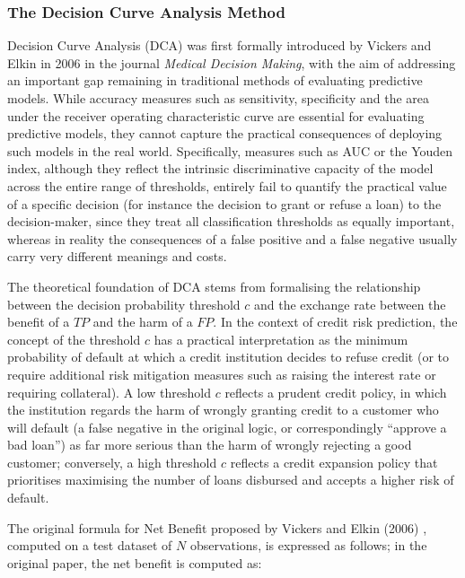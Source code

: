 \begin{enumerate}[label=\alph*)]
\end{enumerate}

\subsubsection{The Decision Curve Analysis Method}
\noindent
Decision Curve Analysis (DCA) was first formally introduced by Vickers and Elkin \cite{vickers2006decision} in 2006 in the journal \textit{Medical Decision Making}, with the aim of addressing an important gap remaining in traditional methods of evaluating predictive models. While accuracy measures such as sensitivity, specificity and the area under the receiver operating characteristic curve are essential for evaluating predictive models, they cannot capture the practical consequences of deploying such models in the real world. Specifically, measures such as AUC or the Youden index, although they reflect the intrinsic discriminative capacity of the model across the entire range of thresholds, entirely fail to quantify the practical value of a specific decision (for instance the decision to grant or refuse a loan) to the decision-maker, since they treat all classification thresholds as equally important, whereas in reality the consequences of a false positive and a false negative usually carry very different meanings and costs.

The theoretical foundation of DCA stems from formalising the relationship between the decision probability threshold $c$ and the exchange rate between the benefit of a $TP$ and the harm of a $FP$. In the context of credit risk prediction, the concept of the threshold $c$ has a practical interpretation as the minimum probability of default at which a credit institution decides to refuse credit (or to require additional risk mitigation measures such as raising the interest rate or requiring collateral). A low threshold $c$ reflects a prudent credit policy, in which the institution regards the harm of wrongly granting credit to a customer who will default (a false negative in the original logic, or correspondingly ``approve a bad loan'') as far more serious than the harm of wrongly rejecting a good customer; conversely, a high threshold $c$ reflects a credit expansion policy that prioritises maximising the number of loans disbursed and accepts a higher risk of default.

\vspace{1em}
The original formula for Net Benefit proposed by Vickers and Elkin (2006) \cite{vickers2006decision}, computed on a test dataset of $N$ observations, is expressed as follows; in the original paper, the net benefit is computed as:

